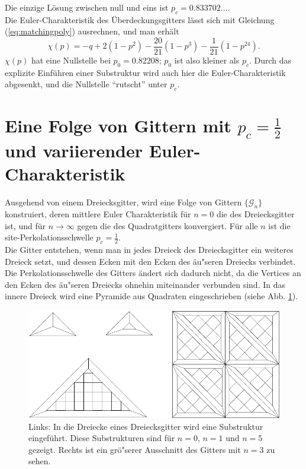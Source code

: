 Die einzige L\"osung zwischen null und eins ist $p_c=0.833702\ldots$.\\
Die Euler-Charakteristik des \"Uberdeckungsgitters l\"asst sich mit Gleichung (\ref{eq:matchingpoly}) ausrechnen, und man erh\"alt
\begin{equation}
  \chi(p)=-q+2(1-p^2)-\frac{20}{21}(1-p^3)-\frac{1}{21}(1-p^{24}).
\end{equation}
$\chi(p)$ hat eine Nullstelle bei $p_0=0.82208$; $p_0$ ist also kleiner als $p_c$. Durch das explizite Einf\"uhren einer Substruktur wird auch hier die Euler-Charakteristik abgesenkt, und die Nullstelle ``rutscht'' unter $p_c$.

\section{Eine Folge von Gittern mit $p_c=\frac{1}{2}$ und variierender Euler-Charakteristik}
Ausgehend von einem Dreiecksgitter, wird eine Folge von Gittern $\{\mathcal{G}_n\}$ konstruiert, deren mittlere Euler Charakteristik f\"ur $n=0$ die des Dreiecksgitter ist, und f\"ur $n \rightarrow \infty$ gegen die des Quadratgitters konvergiert. F\"ur alle $n$ ist die site-Perkolationsschwelle $p_c=\frac{1}{2}$.\\
Die Gitter entstehen, wenn man in jedes Dreieck des Dreiecksgitter ein weiteres Dreieck setzt, und dessen Ecken mit den Ecken des \"au"seren Dreiecks verbindet. Die Perkolationsschwelle des Gitters \"andert sich dadurch nicht, da die Vertices an den Ecken des \"au"seren Dreiecks ohnehin miteinander verbunden sind. In das innere Dreieck wird eine Pyramide aus Quadraten eingeschrieben (siehe Abb. \ref{fig:seqgitter}).
\begin{figure}[tbp]
  \centering
  \includegraphics{./Grenzen-Figs/seqgitter}
  \caption{Links: In die Dreiecke eines Dreiecksgitter wird eine Substruktur eingef\"uhrt. Diese Substrukturen sind f\"ur $n=0$, $n=1$ und $n=5$ gezeigt. Rechts ist ein gr\"o"serer Ausschnitt des Gitters mit $n=3$ zu sehen.}
  \label{fig:seqgitter}
\end{figure}

